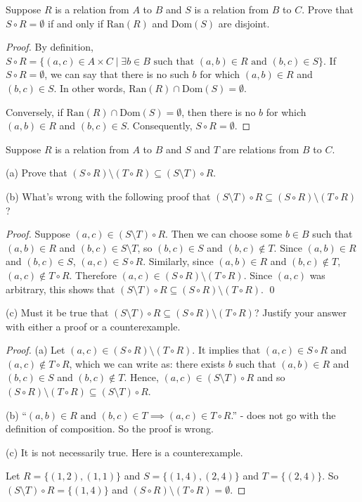 \documentclass[12pt]{article}
\newenvironment{exercise}[2][Exercise]{\begin{trivlist}
\item[\hskip \labelsep {\bfseries #1}\hskip \labelsep {\bfseries #2.}]}{\end{trivlist}}
\newcommand{\nd}{\text{ and }}
\begin{document}
\begin{exercise}
	{11}
	Suppose \( R \) is a relation from \( A \) to \( B \) and \( S \) is a relation from \( B \) to \( C \). Prove that \( S \circ R = \emptyset \) if and only if \( \text{Ran}(R) \) and \( \text{Dom}(S) \) are disjoint.
\end{exercise}

\begin{proof}
	By definition, $S\circ R=\{(a,c)\in A\times C\mid \exists b\in B \text{ such that } (a,b)\in R \nd (b,c)\in S\}$. If $S\circ R=\emptyset$, we can say that there is no such $b$ for which $(a,b)\in R$ and $(b,c)\in S$. In other words, $\text{Ran}(R)\cap \text{Dom}(S)=\emptyset$.

	Conversely, if $\text{Ran}(R)\cap \text{Dom}(S)=\emptyset$, then there is no $b$ for which $(a,b)\in R$ and $(b,c)\in S$. Consequently, $S\circ R=\emptyset$.    
\end{proof}

\begin{exercise}
	{12}
	Suppose \( R \) is a relation from \( A \) to \( B \) and \( S \) and \( T \) are relations from \( B \) to \( C \).

(a) Prove that \( (S \circ R) \setminus (T \circ R) \subseteq (S \setminus T) \circ R \).

(b) What’s wrong with the following proof that \( (S \setminus T) \circ R \subseteq (S \circ R) \setminus (T \circ R) \)?

\textit{Proof.} Suppose \( (a, c) \in (S \setminus T) \circ R \). Then we can choose some \( b \in B \) such that \( (a, b) \in R \) and \( (b, c) \in S \setminus T \), so \( (b, c) \in S \) and \( (b, c) \notin T \). Since \( (a, b) \in R \) and \( (b, c) \in S \), \( (a, c) \in S \circ R \). Similarly, since \( (a, b) \in R \) and \( (b, c) \notin T \), \( (a, c) \notin T \circ R \). Therefore \( (a, c) \in (S \circ R) \setminus (T \circ R) \). Since \( (a, c) \) was arbitrary, this shows that \( (S \setminus T) \circ R \subseteq (S \circ R) \setminus (T \circ R) \). \qed

(c) Must it be true that \( (S \setminus T) \circ R \subseteq (S \circ R) \setminus (T \circ R) \)? Justify your answer with either a proof or a counterexample.
\end{exercise}

\begin{proof}
	(a) Let $(a,c)\in (S\circ R)\setminus (T\circ R)$. It implies that $(a,c)\in S\circ R$ and $(a,c)\notin T\circ R$, which we can write as: there exists $b$ such that $(a,b)\in R$ and $(b,c)\in S$ and $(b,c)\notin T$. Hence, $(a,c)\in (S\setminus T)\circ R$ and so $(S\circ R)\setminus (T\circ R)\subseteq (S\setminus T)\circ R$.

	(b) ``$(a,b)\in R \nd (b,c)\in T \implies (a,c) \in T\circ R$.'' - does not go with the definition of composition. So the proof is wrong.

	(c) It is not necessarily true. Here is a counterexample.
	
	Let $R=\{(1,2),(1,1)\}$ and $S=\{(1,4),(2,4)\}$ and $T=\{(2,4)\}$. So $(S\setminus T)\circ R=\{(1,4)\}$ and $(S\circ R)\setminus (T\circ R)=\emptyset$.
\end{proof}
\end{document}

